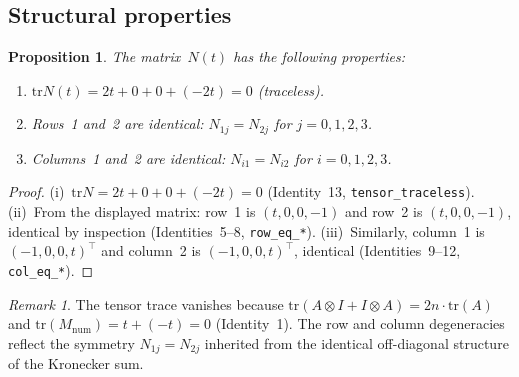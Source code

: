 \documentclass[11pt]{article}
\theoremstyle{plain}
\newtheorem{proposition}[theorem]{Proposition}
\theoremstyle{definition}
\theoremstyle{remark}
\newtheorem{remark}[theorem]{Remark}
\newcommand{\tr}{\mathrm{tr}}
\begin{document}
\subsection{Structural properties}

\begin{proposition}\label{prop:structure}
The matrix~$N(t)$ has the following properties:
\begin{enumerate}[nosep,label=\upshape(\roman*)]
\item $\tr N(t) = 2t + 0 + 0 + (-2t) = 0$ (traceless).
\item Rows~1 and~2 are identical:
      $N_{1j} = N_{2j}$ for $j = 0,1,2,3$.
\item Columns~1 and~2 are identical:
      $N_{i1} = N_{i2}$ for $i = 0,1,2,3$.
\end{enumerate}
\end{proposition}

\begin{proof}
(i)~$\tr N = 2t + 0 + 0 + (-2t) = 0$
(Identity~13, \texttt{tensor\_traceless}).
(ii)~From the displayed matrix: row~1 is $(t, 0, 0, -1)$ and row~2
is $(t, 0, 0, -1)$, identical by inspection
(Identities~5--8, \texttt{row\_eq\_*}).
(iii)~Similarly, column~1 is $(-1, 0, 0, t)^{\!\top}$ and column~2
is $(-1, 0, 0, t)^{\!\top}$, identical
(Identities~9--12, \texttt{col\_eq\_*}).
\end{proof}

\begin{remark}\label{rem:traceless}
The tensor trace vanishes because $\tr(A \otimes I + I \otimes A)
= 2n \cdot \tr(A)$ and $\tr(M_{\mathrm{num}}) = t + (-t) = 0$
(Identity~1).  The row and column degeneracies reflect the
symmetry $N_{1j} = N_{2j}$ inherited from the identical
off-diagonal structure of the Kronecker sum.
\end{remark}
\end{document}
